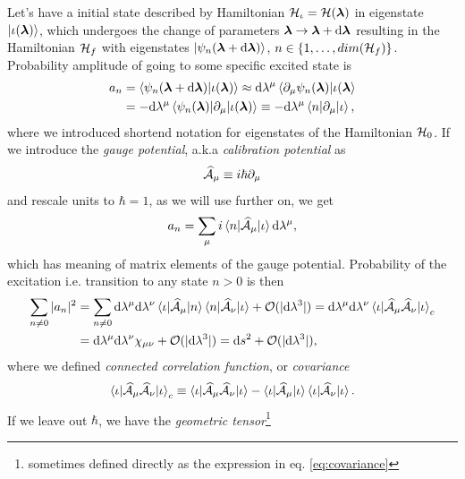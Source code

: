 Let's have a initial state described by Hamiltonian $\H_\iota=\H(\llambda)$ in eigenstate $\ket{\iota(\llambda)}$, which undergoes the change of parameters $\llambda\rightarrow \llambda+\d \llambda$ resulting in the Hamiltonian $\H_f$ with eigenstates $\ket{\psi_n(\llambda+\d \llambda)}$, $n\in \{1,\dots,dim(\H_f)\}$. Probability amplitude of going to some specific excited state is
\begin{equation}
    \begin{split}
        a_n&=\braket{\psi_n(\llambda+\d\llambda)|\iota(\llambda)}\approx \d\lambda^\mu\braket{\partial_\mu \psi_n(\llambda)|\iota(\llambda} \\
        &= -\d\lambda^\mu\braket{\psi_n(\llambda)|\partial_\mu|\iota(\llambda)}\equiv -\d\lambda^\mu\braket{n|\partial_\mu|\iota},
    \end{split}
\end{equation}
where we introduced shortend notation for eigenstates of the Hamiltonian $\H_0$. If we introduce the \emph{gauge potential}, a.k.a \emph{calibration potential} as
\begin{equation}
    \AA_\mu\equiv i\hbar \partial_{\mu}
\end{equation}
and rescale units to $\hbar=1$, as we will use further on, we get
\begin{equation}
   a_n=\sum_\mu i\braket{n|\AA_\mu |\iota}\d\lambda^\mu,
\end{equation}
which has meaning of matrix elements of the gauge potential. Probability of the excitation i.e. transition to any state $n>0$ is then
\begin{equation}
    \begin{split}
        \sum_{n\neq 0}|a_n|^2&=  \sum_{n\neq 0} \d \lambda^\mu \d \lambda^\nu\braket{\iota|\AA_\mu|n}\braket{n|\AA_\nu|\iota}+\O(|\d \lambda^3|) = \d \lambda^\mu \d \lambda^\nu\braket{\iota|\AA_\mu \AA_\nu|\iota}_c\\
        &= \d \lambda^\mu \d \lambda^\nu\chi_{\mu\nu}+\O(|\d \lambda^3|)=\d s^2+\O(|\d \lambda^3|),
    \end{split}
\end{equation}
where we defined \emph{connected correlation function}, or \emph{covariance}
\begin{equation}
    \braket{\iota|\AA_\mu\AA_\nu|\iota}_c\equiv \braket{\iota|\AA_\mu\AA_\nu|\iota} - \braket{\iota|\AA_\mu|\iota}\braket{\iota|\AA_\nu|\iota}.
    \label{eq:covariance}
\end{equation}
If we leave out $\hbar$, we have the \emph{geometric tensor}\footnote{sometimes defined directly as the expression in eq. \ref{eq:covariance}}
